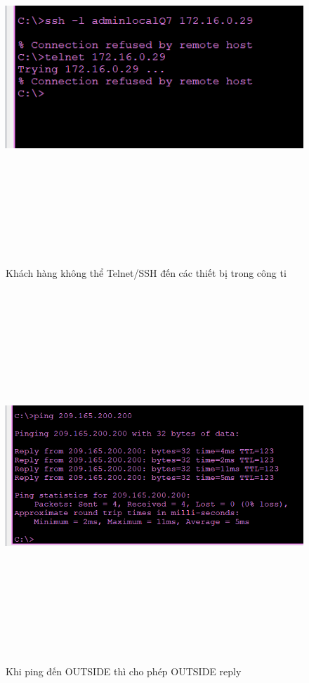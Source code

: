 \documentclass[a4paper, 12pt]{article}
\begin{document}
\begin{figure}[H]
    \centering
    \includegraphics[width=16cm, height=14cm]{img/4.13.1f.png}
    \caption{Khách hàng không thể Telnet/SSH đến các thiết bị trong công ti }
    \label{hinh4131f}
\end{figure}



\begin{figure}[H]
    \centering
    \includegraphics[width=16cm, height=14cm]{img/4.13.1g.png}
    \caption{Khi ping đến OUTSIDE thì cho phép OUTSIDE reply }
    \label{hinh4131g}
\end{figure}
\end{document}
